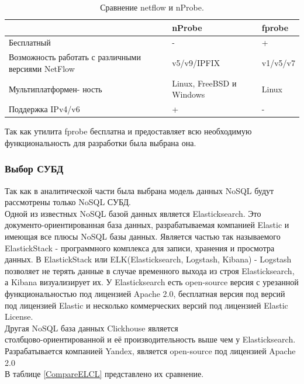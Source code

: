 \begin{table}[H]
\caption{Сравнение netflow и nProbe.}
\begin{center}
\begin{tabular}{ |p{5cm} |p{5cm}| p{5cm} |}
\hline 
 & nProbe & fprobe  \\ \hline 
Бесплатный & - & + \\ \hline 

Возможность работать с различными версиями NetFlow  & v5/v9/IPFIX & v1/v5/v7  \\ \hline 
Мультиплатформен- ность & Linux, FreeBSD и Windows & Linux \\ \hline 
Поддержка IPv4/v6 & + & - \\ \hline
\end{tabular}
\end{center}
\label{CompareProbe}
\end{table}



\indent Так как утилита fprobe бесплатна и предоставляет всю необходимую функциональность для разработки была выбрана она.
 \subsubsection{Выбор СУБД}
Так как в аналитической части была выбрана модель данных NoSQL будут рассмотрены только NoSQL СУБД. \\
	Одной из известных NoSQL базой данных является Elasticksearch. Это документо-ориентированная база данных, разрабатываемая компанией Elastic и имеющая все плюсы NoSQL базы данных. Является частью так называемого ElastickStack - программного комплекса для записи, хранения и просмотра данных. В ElastickStack или ELK(Elasticksearch, Logstash, Kibana) - Logstash позволяет не терять данные в случае временного выхода из строя Elasticksearch, а Kibana визуализирует их. У Elasticksearch есть open-source версия с урезанной функциональностью под лицензией Apache 2.0, бесплатная версия под версий под лицензией Elastic и несколько коммерческих версий под лицензией Elastic License. \\
\indent	Другая NoSQL база данных Clickhouse является  \\ столбцово-ориентированной и её производительность выше чем у Elasticksearch\cite{clickhouse-elastic}. Разрабатывается компанией Yandex, является open-source под лицензией Apache 2.0\\
\indent В таблице \ref{CompareELCL} представлено их сравнение.

